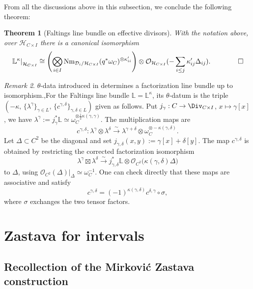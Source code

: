 \documentclass{amsart}
\numberwithin{equation}{section}
\numberwithin{figure}{section}
\newtheorem{thm}{Theorem}[section]
\theoremstyle{definition}
\theoremstyle{remark}
\newtheorem{rmk}[thm]{Remark}
\renewcommand{\b}[1]{\mathbb{#1}}
\begin{document}
From all the discussions above in this subsection, we conclude the following theorem:
\begin{thm}[Faltings line bundle on effective divisors]\label{thm:faltings-on-colored-hilbert}
With the notation above, over \(\mathcal H_{C\times I}\) there is a canonical isomorphism
	$$\left.\mathbb L^\kappa\right|_{\mathcal H_{C\times I}}	\cong		\left(		\bigotimes_{i\in I}		\operatorname{Nm}_{\mathcal D_i/\mathcal H_{C\times I}}
	(q^*\omega_C)^{\otimes\kappa^\prime_{ii}}\right)
	\otimes	\mathcal O_{\mathcal H_{C\times I}}(-\sum_{i\le j}\kappa^\prime_{ij}\Delta_{ij}).\qquad\qed$$
	
\end{thm}
\begin{rmk}\label{thetadata}
	$\theta$-data introduced in \cite[3.10.3]{beilinson2004chiral} determines a factorization line bundle up to isomorphism.,For the Faltings line bundle $\b L=\b L^\kappa$, its $\theta$-datum is the triple $\left(
	-\kappa,\,
	\{\lambda^\gamma\}_{\gamma\in L},\,
	\{c^{\gamma,\delta}\}_{\gamma,\delta\in L}
	\right)$ given as follows.
	Put	$j_\gamma:C\to\Div_{C\times I}$, $x\mapsto\gamma[x]$, we have
	$\lambda^\gamma:=j_\gamma^*\b L
	\simeq\omega_C^{\otimes \frac12\kappa(\gamma,\gamma)}$. The multiplication maps are
	\[
	c^{\gamma,\delta}:
	\lambda^\gamma\otimes\lambda^\delta
	\xrightarrow{\sim}
	\lambda^{\gamma+\delta}\otimes
	\omega_C^{\otimes-\kappa(\gamma,\delta)}.
	\]
	Let $\Delta\subset C^2$ be the diagonal and set
	$j_{\gamma,\delta}(x,y):=\gamma[x]+\delta[y]$.
	The map $c^{\gamma,\delta}$ is obtained by restricting the corrected
	factorization isomorphism
	\[
	\lambda^\gamma\boxtimes\lambda^\delta
	\xrightarrow{\sim}
	j_{\gamma,\delta}^*\b L\otimes
	\mathcal O_{C^2}\bigl(\kappa(\gamma,\delta)\Delta\bigr)
	\]
	to $\Delta$, using
	$\mathcal O_{C^2}(\Delta)|_\Delta\simeq\omega_C^{-1}$.
	One can check directly that these maps are associative and satisfy
	\[
	c^{\gamma,\delta}
	=
	(-1)^{\kappa(\gamma,\delta)}
	c^{\delta,\gamma}\circ\sigma,
	\]
	where $\sigma$ exchanges the two tensor factors.

\end{rmk}
\section{Zastava for intervals}
\subsection{Recollection of the Mirkovi\'c Zastava construction}\label{recollection}
\end{document}
